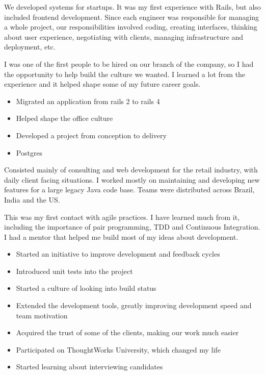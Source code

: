 \documentclass[10pt,a4paper,ragged2e,withhyper]{altacv}
\begin{document}
\begin{paracol}{2}
\divider


{\RaggedRight
We developed systems for startups. It was my first experience with Rails, but also included frontend development. Since each engineer was responsible for managing a whole project, our responsibilities involved coding, creating interfaces, thinking about user experience, negotiating with clients, managing infrastructure and deployment, etc.

I was one of the first people to be hired on our branch of the company, so I had the opportunity to help build the culture we wanted. I learned a lot from the experience and it helped shape some of my future career goals.

\begin{itemize}
\item Migrated an application from rails 2 to rails 4
\item Helped shape the office culture
\item Developed a project from conception to delivery
\item Postgres
\end{itemize}
}

\divider


{\RaggedRight
Consisted mainly of consulting and web development for the retail industry, with daily client facing situations. I worked mostly on maintaining and developing new features for a large legacy Java code base. Teams were distributed across Brazil, India and the US.

This was my first contact with agile practices. I have learned much from it, including the importance of pair programming, TDD and Continuous Integration. I had a mentor that helped me build most of my ideas about development.

\begin{itemize}
\item Started an initiative to improve development and feedback cycles
\item Introduced unit tests into the project
\item Started a culture of looking into build status
\item Extended the development tools, greatly improving development speed and team motivation
\item Acquired the trust of some of the clients, making our work much easier
\item Participated on ThoughtWorks University, which changed my life
\item Started learning about interviewing candidates
\end{itemize}
}


\end{paracol}
\end{document}
